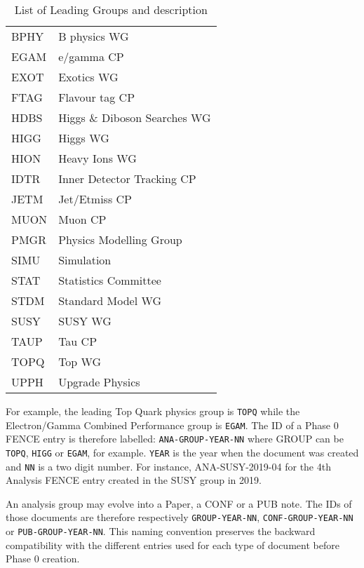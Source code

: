 \begin{table}[h]
\centering
\begin{tabular}{ll}
BPHY & B physics WG                 \\
EGAM & e/gamma CP                   \\
EXOT & Exotics WG                   \\
FTAG & Flavour tag CP               \\
HDBS & Higgs \& Diboson Searches WG \\
HIGG & Higgs WG                     \\
HION & Heavy Ions WG                \\
IDTR & Inner Detector Tracking CP   \\
JETM & Jet/Etmiss CP                \\
MUON & Muon CP                      \\
PMGR & Physics Modelling Group      \\
SIMU & Simulation                   \\
STAT & Statistics Committee         \\
STDM & Standard Model WG            \\
SUSY & SUSY WG                      \\
TAUP & Tau CP                       \\
TOPQ & Top WG                       \\
UPPH & Upgrade Physics             
\end{tabular}
\caption{List of Leading Groups and description }
\label{tab:my-table}
\end{table}


For example, the leading Top Quark physics group is \texttt{TOPQ} while the Electron/Gamma Combined Performance group is \texttt{EGAM}.
The ID of a Phase 0 FENCE entry is therefore labelled: \texttt{ANA-GROUP-YEAR-NN} where GROUP can be \texttt{TOPQ}, \texttt{HIGG} or \texttt{EGAM}, for example.
\texttt{YEAR} is the year when the document was created and \texttt{NN} is a two digit number.
For instance, ANA-SUSY-2019-04 for the 4th Analysis FENCE entry created in the SUSY group in 2019.

An analysis group may evolve into a Paper, a CONF or a PUB note. The IDs of those documents are therefore respectively \texttt{GROUP-YEAR-NN}, \texttt{CONF-GROUP-YEAR-NN} or \texttt{PUB-GROUP-YEAR-NN}.
This naming convention preserves the backward compatibility with the different entries used for each type of document before Phase 0 creation.

